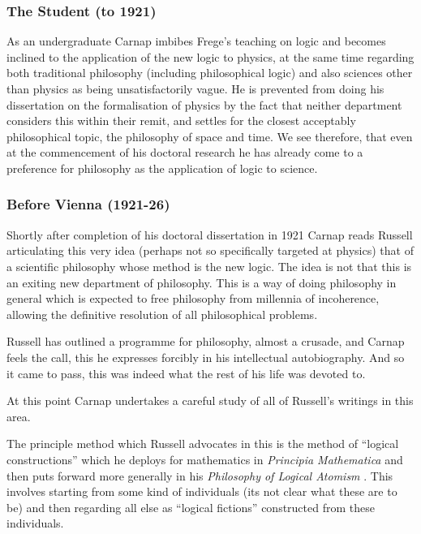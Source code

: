 \documentclass[10pt,titlepage]{book}
\begin{document}
\subsubsection{The Student (to 1921)}

As an undergraduate Carnap imbibes Frege's teaching on logic and becomes inclined to the application of the new logic to physics, at the same  time regarding both traditional philosophy (including philosophical logic) and also sciences other than physics as being unsatisfactorily vague.
He is prevented from doing his dissertation on the formalisation of physics by the fact that neither department considers this within their remit, and settles for the closest acceptably philosophical topic, the philosophy of space and time.
We see therefore, that even at the commencement of his doctoral research he has already come to a preference for philosophy as the application of logic to science.

\subsubsection{Before Vienna (1921-26)}

Shortly after completion of his doctoral dissertation in 1921 Carnap reads Russell articulating this very idea (perhaps not so specifically targeted at physics) that of a scientific philosophy whose method is the new logic.
The idea is not that this is an exiting new department of philosophy.
This is a way of doing philosophy in general which is expected to free philosophy from millennia of incoherence, allowing the definitive resolution of all philosophical problems.

Russell has outlined a programme for philosophy, almost a crusade, and Carnap feels the call, this he expresses forcibly in his intellectual autobiography.
And so it came to pass, this was indeed what the rest of his life was devoted to.

At this point Carnap undertakes a careful study of all of Russell's writings in this area.

The principle method which Russell advocates in this is the method of ``logical constructions'' which he deploys for mathematics in \emph{Principia Mathematica} \cite{russell10} and then puts forward more generally in his \emph{Philosophy of Logical Atomism} \cite{russellPLA}.
This involves starting from some kind of individuals (its not clear what these are to be) and then regarding all else as ``logical fictions'' constructed from these individuals.
\end{document}
